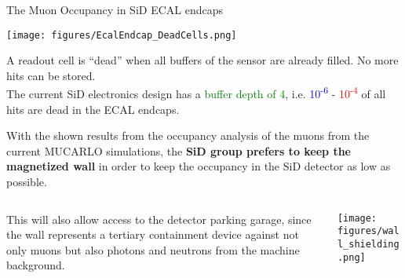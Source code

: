 \documentclass[xcolor={dvipsnames}]{beamer}
\begin{document}
\begin{frame}{The Muon Occupancy in SiD ECAL endcaps}
\begin{center}
  \texttt{[image: figures/EcalEndcap\_DeadCells.png]}
\end{center}
{\small A readout cell is ``dead'' when all buffers of the sensor are already filled. No more hits can be stored.}\\
The current SiD electronics design has a \textcolor{Green}{buffer depth of 4}, i.e. \textcolor{Blue}{10\textsuperscript{-6}} - \textcolor{Red}{10\textsuperscript{-4}} of all hits are dead in the ECAL endcaps.
\end{frame}
\begin{frame}
 With the shown results from the occupancy analysis of the muons from the current MUCARLO simulations, the \textbf{SiD group prefers to keep the magnetized wall} in order to keep the occupancy in the SiD detector as low as possible.
 \begin{columns}
  \begin{column}{0.4\textwidth}
    This will also allow access to the detector parking garage, since the wall represents a tertiary containment device against not only muons but also photons and neutrons from the machine background.
  \end{column}
  \begin{column}{0.6\textwidth}
    \texttt{[image: figures/wall\_shielding.png]}
  \end{column}
 \end{columns}
\end{frame}
\end{document}
